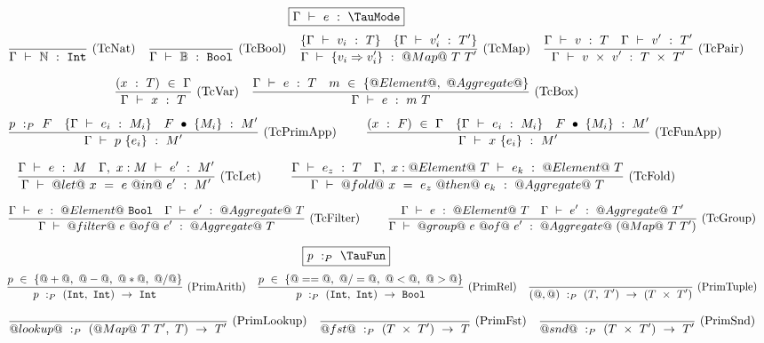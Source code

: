 
\begin{figure}
  \scriptsize

$$
\boxed{\Typecheck{\Gamma}{e}{\TauMode}}
$$
$$
\enskip \frac {\displaystyle 
} {\displaystyle  
    \Gamma ~\vdash~ \mathbb{N}~:~\mathtt{Int}
} \  \mbox{(TcNat)} \enskip
\enskip \frac {\displaystyle 
} {\displaystyle  
    \Gamma ~\vdash~ \mathbb{B}~:~\mathtt{Bool}
} \  \mbox{(TcBool)} \enskip
\enskip \frac {\displaystyle 
  \{ \Gamma ~\vdash~ v_i~:~T \}
  \quad
  \{ \Gamma ~\vdash~ v_i'~:~T' \}
} {\displaystyle  
    \Gamma ~\vdash~ \{v_i \Rightarrow v_i'\}~:~@Map@~T~T'
} \  \mbox{(TcMap)} \enskip
\enskip \frac {\displaystyle 
  \Gamma ~\vdash~ v~:~T
  \quad
  \Gamma ~\vdash~ v'~:~T'
} {\displaystyle  
    \Gamma ~\vdash~ v~\times~v'~:~T~\times~T'
} \  \mbox{(TcPair)} \enskip
$$

$$
\enskip \frac {\displaystyle 
    (x~:~T)~\in~\Gamma
} {\displaystyle  
    \Gamma ~\vdash~ x~:~T
} \  \mbox{(TcVar)} \enskip
\enskip \frac {\displaystyle 
  \Gamma ~\vdash~ e~:~T
  \quad
  m~\in~\{@Element@,~@Aggregate@\}
} {\displaystyle  
    \Gamma ~\vdash~ e~:~m~T
} \  \mbox{(TcBox)} \enskip
$$

$$
\enskip \frac {\displaystyle 
    p~:_P~F
    \quad
    \{ \Gamma ~\vdash~ e_i~:~M_i \}
    \quad
    F~\bullet~\{M_i\}~:~M'
} {\displaystyle  
    \Gamma ~\vdash~ p~\{e_i\}~:~M'
} \  \mbox{(TcPrimApp)} \enskip~~~~
\enskip \frac {\displaystyle 
    (x~:~F)~\in~\Gamma
    \quad
    \{ \Gamma ~\vdash~ e_i~:~M_i \}
    \quad
    F~\bullet~\{M_i\}~:~M'
} {\displaystyle  
    \Gamma ~\vdash~ x~\{e_i\}~:~M'
} \  \mbox{(TcFunApp)} \enskip
$$

$$
\enskip \frac {\displaystyle 
  \Gamma ~\vdash~ e~:~M
  \quad
  \Gamma,~x:M ~\vdash~ e'~:~M'
} {\displaystyle 
  \Gamma ~\vdash~ @let@~x~=~e~@in@~e'~:~M'
} \  \mbox{(TcLet)} \enskip~~~~
\enskip \frac {\displaystyle 
  \Gamma ~\vdash~ e_z~:~T
  \quad
  \Gamma,~x:@Element@~T ~\vdash~ e_k~:~@Element@~T
} {\displaystyle 
  \Gamma ~\vdash~ @fold@~x~=~e_z~@then@~e_k~:~@Aggregate@~T
} \  \mbox{(TcFold)} \enskip
$$

$$
\enskip \frac {\displaystyle 
  \Gamma ~\vdash~ e~:~@Element@~\mathtt{Bool}
  \quad
  \Gamma ~\vdash~ e'~:~@Aggregate@~T
} {\displaystyle 
  \Gamma ~\vdash~ @filter@~e~@of@~e'~:~@Aggregate@~T
} \  \mbox{(TcFilter)} \enskip~~~~
\enskip \frac {\displaystyle 
  \Gamma ~\vdash~ e~:~@Element@~T
  \quad
  \Gamma ~\vdash~ e'~:~@Aggregate@~T'
} {\displaystyle 
  \Gamma ~\vdash~ @group@~e~@of@~e'~:~@Aggregate@~(@Map@~T~T')
} \  \mbox{(TcGroup)} \enskip
$$


$$
\boxed{\TypecheckP{\mi{p}}{\TauFun}}
$$
$$
\enskip \frac {\displaystyle 
  p~\in~\{@+@,~@-@,~@*@,~@/@\}
} {\displaystyle 
  p~:_P~(\mathtt{Int},~\mathtt{Int})~\to~\mathtt{Int}
} \  \mbox{(PrimArith)} \enskip
\enskip \frac {\displaystyle 
  p~\in~\{@==@,~@/=@,~@<@,~@>@\}
} {\displaystyle 
  p~:_P~(\mathtt{Int},~\mathtt{Int})~\to~\mathtt{Bool}
} \  \mbox{(PrimRel)} \enskip
\enskip \frac {\displaystyle } {\displaystyle 
  (@,@)~:_P~(T,~T')~\to~(T~\times~T')
} \  \mbox{(PrimTuple)} \enskip
$$

$$
\enskip \frac {\displaystyle } {\displaystyle 
  @lookup@~:_P~(@Map@~T~T',~T)~\to~T'
} \  \mbox{(PrimLookup)} \enskip
\enskip \frac {\displaystyle } {\displaystyle 
  @fst@~:_P~(T~\times~T')~\to~T
} \  \mbox{(PrimFst)} \enskip
\enskip \frac {\displaystyle } {\displaystyle 
  @snd@~:_P~(T~\times~T')~\to~T'
} \  \mbox{(PrimSnd)} \enskip
$$




\end{figure}
